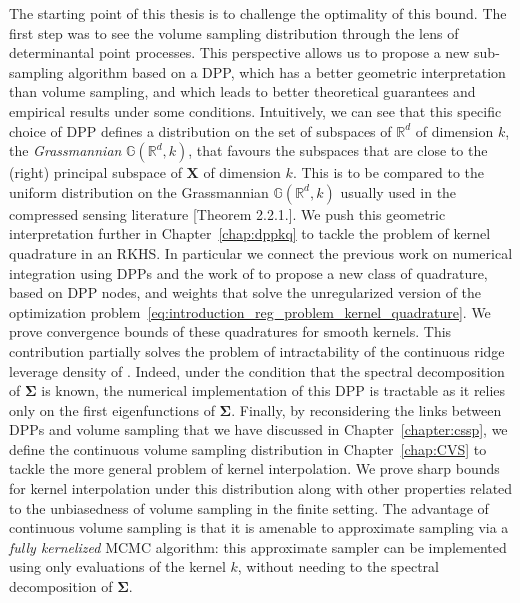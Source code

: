 \documentclass[twoside,11pt]{book}
\numberwithin{theorem}{chapter}
\numberwithin{definition}{chapter}
\numberwithin{proposition}{chapter}
\numberwithin{corollary}{chapter}
\numberwithin{example}{chapter}
\numberwithin{lemma}{chapter}
\numberwithin{assumption}{chapter}
\numberwithin{equation}{chapter}
\numberwithin{figure}{chapter}
\begin{document}
The starting point of this thesis is to challenge the optimality of this bound. The first step was to see the volume sampling distribution through the lens of determinantal point processes. This perspective allows us to propose a new sub-sampling algorithm based on a DPP, which has a better geometric interpretation than volume sampling, and which leads to better theoretical guarantees and empirical results under some conditions. Intuitively, we can see that this specific choice of DPP defines a distribution on the set of subspaces of $\mathbb{R}^{d}$ of dimension $k$, the \emph{Grassmannian} $\mathbb{G}(\mathbb{R}^{d},k)$, that favours the subspaces that are close to the (right) principal subspace of $\bm{X}$ of dimension $k$. This is to be compared to the uniform distribution on the Grassmannian $\mathbb{G}(\mathbb{R}^{d},k)$ usually used in the compressed sensing literature \parencite{Chi12}[Theorem 2.2.1.]. We push this geometric interpretation further in Chapter~\ref{chap:dppkq} to tackle the problem of kernel quadrature in an RKHS. In particular we connect the previous work on numerical integration using DPPs \citep*{BaHa16} and the work of \parencite{Bac17} to propose a new class of quadrature, based on DPP nodes, and weights that solve the unregularized version of the optimization problem~\eqref{eq:introduction_reg_problem_kernel_quadrature}. We prove convergence bounds of these quadratures for smooth kernels. This contribution partially solves the problem of intractability of the continuous ridge leverage density of \parencite{Bac17}. Indeed, under the condition that the spectral decomposition of $\bm{\Sigma}$ is known, the numerical implementation of this DPP is tractable as it relies only on the first eigenfunctions of $\bm{\Sigma}$. Finally, by reconsidering the links between DPPs and volume sampling that we have discussed in Chapter~\ref{chapter:cssp}, we define the continuous volume sampling distribution in Chapter~\ref{chap:CVS} to tackle the more general problem of kernel interpolation. We prove sharp bounds for kernel interpolation under this distribution along with other properties related to the unbiasedness of volume sampling in the finite setting. The advantage of continuous volume sampling is that it is amenable to approximate sampling via a \emph{fully kernelized} MCMC algorithm: this approximate sampler can be implemented using only evaluations of the kernel $k$, without needing to the spectral decomposition of $\bm{\Sigma}$.

\end{document}
